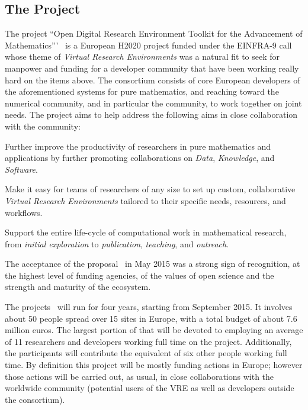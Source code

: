 \subsection{The \ODK Project}
The project ``Open Digital Research Environment Toolkit for the Advancement of
Mathematics'''~\cite{OpenDreamKit:on} is a European H2020 project funded under the
EINFRA-9 call~\cite{EINFRA-9} whose theme of \emph{Virtual Research Environments} was a
natural fit to seek for manpower and funding for a developer community that have been
working really hard on the items above. The \ODK consortium consists of core European
developers of the aforementioned systems for pure mathematics, and reaching toward the
numerical community, and in particular the \Jupyter community, to work together on joint
needs. The project aims to help address the following aims in close collaboration with the
community:
\begin{compactenum}
\item Further improve the productivity of researchers in pure mathematics and applications
  by further promoting collaborations on \emph{Data}, \emph{Knowledge}, and
  \emph{Software}.
\item Make it easy for teams of researchers of any size to set up custom, collaborative
  \emph{Virtual Research Environments} tailored to their specific needs, resources, and
  workflows.
\item Support the entire life-cycle of computational work in mathematical research, from
  \emph{initial exploration} to \emph{publication}, \emph{teaching}, and \emph{outreach}.
\end{compactenum}
The acceptance of the proposal~\cite{ODKproposal:on} in May 2015 was a strong sign of
recognition, at the highest level of funding agencies, of the values of open science and
the strength and maturity of the ecosystem.

The \ODK projects~\cite{ODKproposal:on} will run for four years, starting from September
2015. It involves about 50 people spread over 15 sites in Europe, with a total budget of
about 7.6 million euros. The largest portion of that will be devoted to employing an
average of 11 researchers and developers working full time on the project. Additionally,
the participants will contribute the equivalent of six other people working full time.  By
definition this project will be mostly funding actions in Europe; however those actions
will be carried out, as usual, in close collaborations with the worldwide community
(potential users of the VRE as well as developers outside the \ODK consortium).

